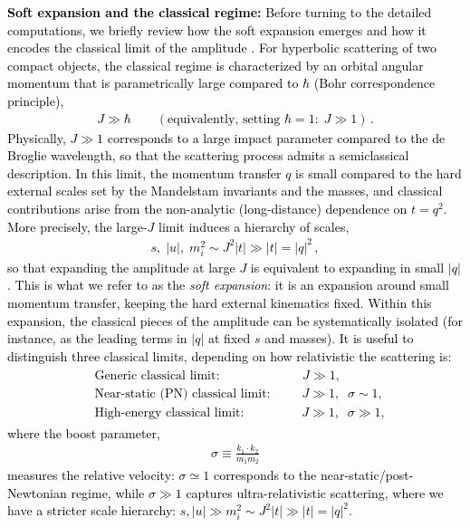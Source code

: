 \textcolor{black}{
\textbf{Soft expansion and the classical regime:}
Before turning to the detailed computations, we briefly review how the soft expansion emerges and how it encodes the classical limit of the amplitude \cite{Neill:2013wsa,Parra-Martinez:2020dzs}.
For hyperbolic scattering of two compact objects, the classical regime is characterized by an orbital angular momentum that is parametrically large compared to $\hbar$ (Bohr correspondence principle),
\begin{align}
J \gg \hbar \qquad (\text{equivalently, setting }\hbar=1:\; J\gg 1)\, .
\end{align}
Physically, $J\gg 1$ corresponds to a large impact parameter compared to the de Broglie wavelength, so that the scattering process admits a semiclassical description.
In this limit, the momentum transfer $q$ is small compared to the hard external scales set by the Mandelstam invariants and the masses, and classical contributions arise from the non-analytic (long-distance) dependence on $t=q^2$. More precisely, the large-$J$ limit induces a hierarchy of scales,
\begin{align}
s,\; |u|,\; m_i^2 \sim J^2 |t| \gg |t| = |q|^2 \, ,
\end{align}
so that expanding the amplitude at large $J$ is equivalent to expanding in small $|q|$.
This is what we refer to as the \emph{soft expansion}: it is an expansion around small momentum transfer, keeping the hard external kinematics fixed.
Within this expansion, the classical pieces of the amplitude can be systematically isolated (for instance, as the leading terms in $|q|$ at fixed $s$ and masses). It is useful to distinguish three classical limits, depending on how relativistic the scattering is:
\begin{align}
\begin{split}
    &\textrm{Generic classical limit:} \qquad\qquad\qquad\;\; J \gg 1,\\
    &\textrm{Near-static (PN) classical limit:} \qquad\,\,\, J \gg 1,\;\; \sigma \sim 1,\\
    &\textrm{High-energy classical limit:} \qquad\qquad\;\; J \gg 1,\;\; \sigma \gg 1,
\end{split}
\end{align}
where the boost parameter,
\begin{align}
\sigma \equiv \frac{k_1\!\cdot\! k_2}{m_1 m_2}
\end{align}
measures the relative velocity: $\sigma\simeq 1$ corresponds to the near-static/post-Newtonian regime, while $\sigma\gg 1$ captures ultra-relativistic scattering, where we have a stricter scale hierarchy: $s,|u|\gg m_i^2\sim J^2|t|\gg |t|=|q|^2$.
}
